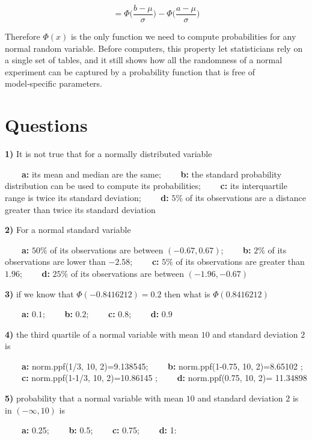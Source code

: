 \documentclass[
]{book}
\begin{document}
\[=\Phi \big(\frac{b-\mu}{\sigma}\big)-\Phi \big(\frac{a-\mu}{\sigma}\big)\]

Therefore \(\Phi(x)\) is the only function we need to compute probabilities for any normal random variable. Before computers, this property let statisticians rely on a single set of tables, and it still shows how all the randomness of a normal experiment can be captured by a probability function that is free of model‑specific parameters.

\hypertarget{questions-6}{%
\section{Questions}\label{questions-6}}

\textbf{1)} It is not true that for a normally distributed variable

\textbf{\(\qquad\)a:} its mean and median are the same; \textbf{\(\qquad\)b:} the standard probability distribution can be used to compute its probabilities; \textbf{\(\qquad\)c:} its interquartile range is twice its standard deviation; \textbf{\(\qquad\)d:} \(5\%\) of its observations are a distance greater than twice its standard deviation

\textbf{2)} For a normal standard variable

\textbf{\(\qquad\)a:} \(50\%\) of its observations are between \((-0.67,0.67)\);
\textbf{\(\qquad\)b:} \(2\%\) of its observations are lower than \(-2.58\);
\textbf{\(\qquad\)c:} \(5\%\) of its observations are greater than \(1.96\);
\textbf{\(\qquad\)d:} \(25\%\) of its observations are between \((-1.96,-0.67)\)

\textbf{3)} if we know that \(\Phi(-0.8416212)=0.2\) then what is \(\Phi(0.8416212)\)

\textbf{\(\qquad\)a:} \(0.1\);
\textbf{\(\qquad\)b:} \(0.2\);
\textbf{\(\qquad\)c:} \(0.8\);
\textbf{\(\qquad\)d:} \(0.9\)

\textbf{4)} the third quartile of a normal variable with mean \(10\) and standard deviation \(2\) is

\textbf{\(\qquad\)a:} norm.ppf(1/3, 10, 2)=9.138545;
\textbf{\(\qquad\)b:} norm.ppf(1-0.75, 10, 2)=8.65102 ;
\textbf{\(\qquad\)c:} norm.ppf(1-1/3, 10, 2)=10.86145 ;
\textbf{\(\qquad\)d:} norm.ppf(0.75, 10, 2)= 11.34898

\textbf{5)} probability that a normal variable with mean \(10\) and standard deviation \(2\) is in \((-\infty,10)\) is

\textbf{\(\qquad\)a:} 0.25;
\textbf{\(\qquad\)b:} 0.5;
\textbf{\(\qquad\)c:} 0.75;
\textbf{\(\qquad\)d:} 1:
\end{document}
